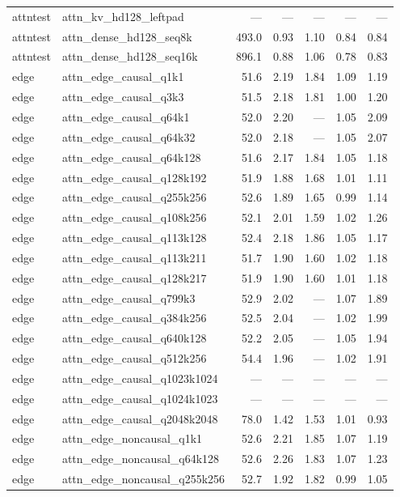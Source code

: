 \begin{longtable}{@{}llrrrrr@{}}
attntest & attn\_kv\_hd128\_leftpad & --- & --- & --- & --- & --- \\
attntest & attn\_dense\_hd128\_seq8k & 493.0 & 0.93 & 1.10 & 0.84 & 0.84 \\
attntest & attn\_dense\_hd128\_seq16k & 896.1 & 0.88 & 1.06 & 0.78 & 0.83 \\
edge & attn\_edge\_causal\_q1k1 & 51.6 & 2.19 & 1.84 & 1.09 & 1.19 \\
edge & attn\_edge\_causal\_q3k3 & 51.5 & 2.18 & 1.81 & 1.00 & 1.20 \\
edge & attn\_edge\_causal\_q64k1 & 52.0 & 2.20 & --- & 1.05 & 2.09 \\
edge & attn\_edge\_causal\_q64k32 & 52.0 & 2.18 & --- & 1.05 & 2.07 \\
edge & attn\_edge\_causal\_q64k128 & 51.6 & 2.17 & 1.84 & 1.05 & 1.18 \\
edge & attn\_edge\_causal\_q128k192 & 51.9 & 1.88 & 1.68 & 1.01 & 1.11 \\
edge & attn\_edge\_causal\_q255k256 & 52.6 & 1.89 & 1.65 & 0.99 & 1.14 \\
edge & attn\_edge\_causal\_q108k256 & 52.1 & 2.01 & 1.59 & 1.02 & 1.26 \\
edge & attn\_edge\_causal\_q113k128 & 52.4 & 2.18 & 1.86 & 1.05 & 1.17 \\
edge & attn\_edge\_causal\_q113k211 & 51.7 & 1.90 & 1.60 & 1.02 & 1.18 \\
edge & attn\_edge\_causal\_q128k217 & 51.9 & 1.90 & 1.60 & 1.01 & 1.18 \\
edge & attn\_edge\_causal\_q799k3 & 52.9 & 2.02 & --- & 1.07 & 1.89 \\
edge & attn\_edge\_causal\_q384k256 & 52.5 & 2.04 & --- & 1.02 & 1.99 \\
edge & attn\_edge\_causal\_q640k128 & 52.2 & 2.05 & --- & 1.05 & 1.94 \\
edge & attn\_edge\_causal\_q512k256 & 54.4 & 1.96 & --- & 1.02 & 1.91 \\
edge & attn\_edge\_causal\_q1023k1024 & --- & --- & --- & --- & --- \\
edge & attn\_edge\_causal\_q1024k1023 & --- & --- & --- & --- & --- \\
edge & attn\_edge\_causal\_q2048k2048 & 78.0 & 1.42 & 1.53 & 1.01 & 0.93 \\
edge & attn\_edge\_noncausal\_q1k1 & 52.6 & 2.21 & 1.85 & 1.07 & 1.19 \\
edge & attn\_edge\_noncausal\_q64k128 & 52.6 & 2.26 & 1.83 & 1.07 & 1.23 \\
edge & attn\_edge\_noncausal\_q255k256 & 52.7 & 1.92 & 1.82 & 0.99 & 1.05 \\

\end{longtable}
